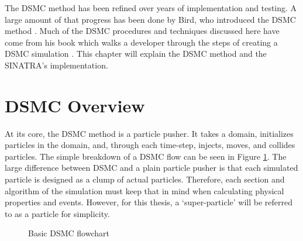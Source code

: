 The DSMC method has been refined over years of implementation and testing. A large amount of that progress has been done by Bird, who introduced the DSMC method \cite{bird_76}. Much of the DSMC procedures and techniques discussed here have come from his book which walks a developer through the steps of creating a DSMC simulation \cite{bird_dsmc}. This chapter will explain the DSMC method and the SINATRA's implementation. \par

\section{DSMC Overview}

\indent At its core, the DSMC method is a particle pusher. It takes a domain, initializes particles in the domain, and, through each time-step, injects, moves, and collides particles. The simple breakdown of a DSMC flow can be seen in Figure \ref{fig:dsmc_flow}. The large difference between DSMC and a plain particle pusher is that each simulated particle is designed as a clump of actual particles. Therefore, each section and algorithm of the simulation must keep that in mind when calculating physical properties and events. However, for this thesis, a `super-particle' will be referred to as a particle for simplicity. \par

\begin{figure}
\centering
    \caption[Basic DSMC flowchart]{Basic DSMC flowchart \textmd{\cite{Galvez2018a}}}
    \label{fig:dsmc_flow}
\end{figure}


